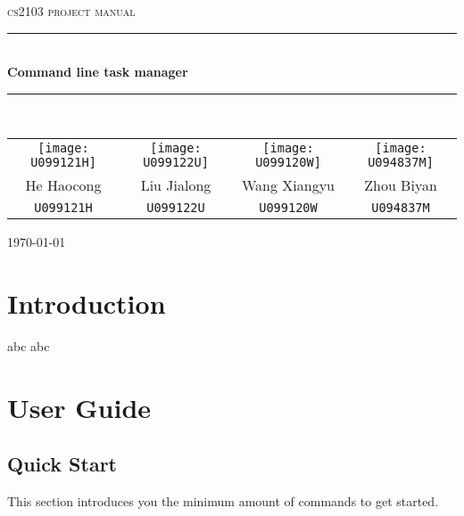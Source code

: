 \documentclass[12pt, a4paper]{article}
\begin{document}
\begin{titlepage}
  \centering

  \textsc{\LARGE cs2103 project manual}
  \\[1.5cm]
  \hrule
  \\[0.5cm]
  \Large \bfseries Command line task manager
  \\[0.4cm]
  \hrule
  \\[1.5cm]

  \begin{tabular}{c | c | c | c}
    \texttt{[image: U099121H]}&
    \texttt{[image: U099122U]}&
    \texttt{[image: U099120W]}&
    \texttt{[image: U094837M]}\\

    \small{He Haocong} & \small{Liu Jialong} & \small{Wang Xiangyu} & \small{Zhou Biyan}\\
    \small{\texttt{U099121H}} & \small{\texttt{U099122U}} & \small{\texttt{U099120W}} & \small{\texttt{U094837M}}\\
  \end{tabular}

  \vfill
  {\large \today}
\end{titlepage}

\tableofcontents
\newpage

\section{Introduction}
abc abc

\section{User Guide}
\subsection{Quick Start}

This section introduces you the minimum amount of commands to get started.
\end{document}
